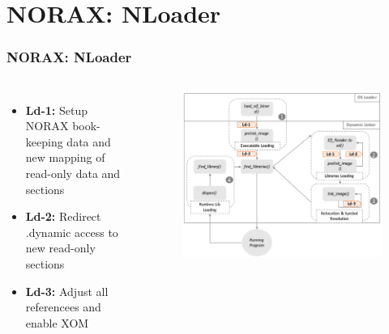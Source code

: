 \documentclass[aspectratio=169]{beamer}
\begin{document}

\section{NORAX: NLoader}
\begin{frame}
\frametitle{NORAX: NLoader}
\begin{columns}[c]
\begin{itemize}
\item \textbf{Ld-1: }Setup NORAX book-keeping data and new mapping of read-only data and sections
\item \textbf{Ld-2: }Redirect .dynamic access to new read-only sections
\item \textbf{Ld-3: }Adjust all referencees and enable XOM
\end{itemize}
\begin{figure}
\includegraphics[width=1.0\linewidth]{figures/nloader.pdf}
\end{figure}
\end{columns}
\end{frame}

\end{document}
